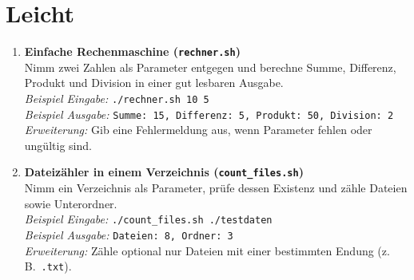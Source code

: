 \documentclass[11pt, oneside, numbers=nönddot]{scrbook}
\begin{document}
\section{Leicht}
\begin{enumerate}
\item \textbf{Einfache Rechenmaschine (\texttt{rechner.sh})}\\
Nimm zwei Zahlen als Parameter entgegen und berechne Summe, Differenz, Produkt und Division in einer gut lesbaren Ausgabe.\\
\textit{Beispiel Eingabe:} \texttt{./rechner.sh 10 5}\\
\textit{Beispiel Ausgabe:} \texttt{Summe: 15, Differenz: 5, Produkt: 50, Division: 2}\\
\textit{Erweiterung:} Gib eine Fehlermeldung aus, wenn Parameter fehlen oder ungültig sind.

\item \textbf{Dateizähler in einem Verzeichnis (\texttt{count\_files.sh})}\\
Nimm ein Verzeichnis als Parameter, prüfe dessen Existenz und zähle Dateien sowie Unterordner.\\
\textit{Beispiel Eingabe:} \texttt{./count\_files.sh ./testdaten}\\
\textit{Beispiel Ausgabe:} \texttt{Dateien: 8, Ordner: 3}\\
\textit{Erweiterung:} Zähle optional nur Dateien mit einer bestimmten Endung (z.\,B.\ \texttt{.txt}).
\end{enumerate}
\end{document}
